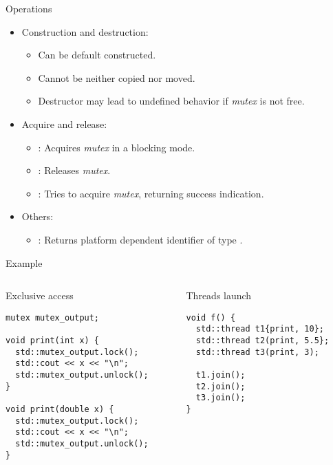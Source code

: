 \begin{frame}[t]{Operations}
\begin{itemize}
  \item Construction and destruction:
    \begin{itemize}
      \item Can be default constructed.
      \item Cannot be neither copied nor moved.
      \item Destructor may lead to undefined behavior if \emph{mutex} is not free.
    \end{itemize}
  \vfill
  \item Acquire and release:
    \begin{itemize}
      \item {}: Acquires \emph{mutex} in a blocking mode.
      \item {}: Releases \emph{mutex}.
      \item {}: Tries to acquire \emph{mutex}, returning success indication.
    \end{itemize}
  \vfill
  \item Others:
    \begin{itemize}
      \item {}: Returns platform dependent identifier of type .
    \end{itemize}
\end{itemize}
\end{frame}

\begin{frame}[fragile]{Example}
\begin{columns}

\begin{column}{.5\textwidth}
\begin{block}{Exclusive access}
\begin{lstlisting}
mutex mutex_output;

void print(int x) {
  std::mutex_output.lock();
  std::cout << x << "\n";
  std::mutex_output.unlock();
}

void print(double x) {
  std::mutex_output.lock();
  std::cout << x << "\n";
  std::mutex_output.unlock();
}
\end{lstlisting}
\end{block}
\end{column}

\begin{column}{.5\textwidth}
\begin{block}{Threads launch}
\begin{lstlisting}
void f() {
  std::thread t1{print, 10};
  std::thread t2(print, 5.5};
  std::thread t3(print, 3);
 
  t1.join(); 
  t2.join(); 
  t3.join();
}
\end{lstlisting}
\end{block}
\end{column}

\end{columns}
\end{frame}

